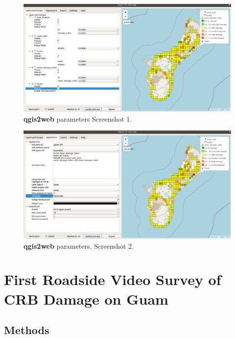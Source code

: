 \documentclass[12pt,letterpaper,english,bibliography=totocnumbered, abstract=on]{scrartcl}
\begin{document}




\begin{figure}[H]
	\centering
	\includegraphics[width=\linewidth]{images/qgis2web1.png}
	\caption{\textbf{qgis2web} parameters Screenshot 1.}
	\label{fig:qgis2web1}
\end{figure}

\begin{figure}[H]
	\centering
	\includegraphics[width=\linewidth]{images/qgis2web2.png}
	\caption{\textbf{qgis2web} parameters. Screenshot 2.}
	\label{fig:qgis2web2}
\end{figure}


\section{First Roadside Video Survey of CRB Damage on Guam}

\subsection{Methods}
\end{document}
